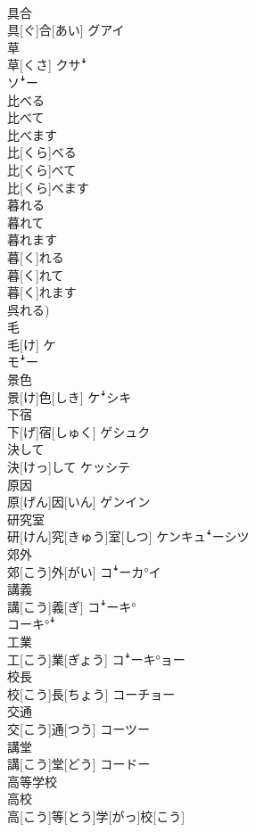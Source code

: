 \documentclass[8pt]{extreport}
\begin{document}
\begin{CJK}{UTF8}{min}
\\	具合	
\\	具[ぐ]合[あい]	グアイ
\\	草	
\\	草[くさ]	クサꜜ 
\\	ソꜜー
\\	比べる 
\\	比べて 
\\	比べます	
\\	比[くら]べる 
\\	比[くら]べて 
\\	比[くら]べます	
\\	暮れる 
\\	暮れて 
\\	暮れます	
\\	暮[く]れる 
\\	暮[く]れて 
\\	暮[く]れます 
\\	呉れる)	
\\	毛	
\\	毛[け]	ケ 
\\	モꜜー
\\	景色	
\\	景[け]色[しき]	ケꜜシキ
\\	下宿	
\\	下[げ]宿[しゅく]	ゲシュク
\\	決して	
\\	決[けっ]して	ケッシテ
\\	原因	
\\	原[げん]因[いん]	ゲンイン
\\	研究室	
\\	研[けん]究[きゅう]室[しつ]	ケンキュꜜーシツ
\\	郊外	
\\	郊[こう]外[がい]	コꜜーカ°イ
\\	講義	
\\	講[こう]義[ぎ]	コꜜーキ° 
\\	コーキ°ꜜ
\\	工業	
\\	工[こう]業[ぎょう]	コꜜーキ°ョー
\\	校長	
\\	校[こう]長[ちょう]	コーチョー
\\	交通	
\\	交[こう]通[つう]	コーツー
\\	講堂	
\\	講[こう]堂[どう]	コードー
\\	高等学校 
\\	高校	
\\	高[こう]等[とう]学[がっ]校[こう] 

\end{CJK}
\end{document}

